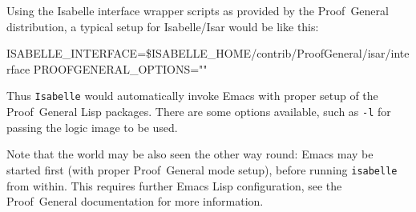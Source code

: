 Using the Isabelle interface wrapper scripts as provided by the Proof~General
distribution, a typical setup for Isabelle/Isar would be like this:
\begin{ttbox}
ISABELLE_INTERFACE=\$ISABELLE_HOME/contrib/ProofGeneral/isar/interface
PROOFGENERAL_OPTIONS=""
\end{ttbox}
Thus \texttt{Isabelle} would automatically invoke Emacs with proper setup of
the Proof~General Lisp packages.  There are some options available, such as
\texttt{-l} for passing the logic image to be used.

\medskip Note that the world may be also seen the other way round: Emacs may
be started first (with proper Proof~General mode setup), before running
\texttt{isabelle} from within.  This requires further Emacs Lisp
configuration, see the Proof~General documentation \cite{proofgeneral} for
more information.

